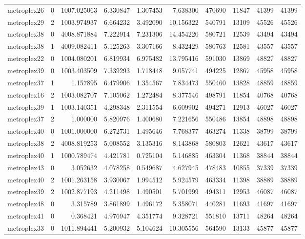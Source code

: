 \begin{longtable}{|l|r|r|r|r|r|r|r|r|r|}
metroplex26 & 0 & 1007.025063 & 6.330847 & 1.307453 & 7.638300 & 470690 & 11847 & 41399 & 41399 \\
metroplex29 & 2 & 1003.974937 & 6.664232 & 3.492090 & 10.156322 & 540791 & 13109 & 45526 & 45526 \\
metroplex38 & 0 & 4008.871884 & 7.222914 & 7.231306 & 14.454220 & 580721 & 12539 & 43494 & 43494 \\
metroplex38 & 1 & 4009.082411 & 5.125263 & 3.307166 & 8.432429 & 580763 & 12581 & 43557 & 43557 \\
metroplex22 & 0 & 1004.080201 & 6.819934 & 6.975482 & 13.795416 & 591030 & 13869 & 48827 & 48827 \\
metroplex39 & 0 & 1003.403509 & 7.339293 & 1.718448 & 9.057741 & 494225 & 12867 & 45958 & 45958 \\
metroplex37 & 1 & 1.157895 & 6.479906 & 1.354567 & 7.834473 & 550460 & 13828 & 48859 & 48859 \\
metroplex16 & 2 & 1003.082707 & 7.105062 & 1.272484 & 8.377546 & 498791 & 11854 & 40768 & 40768 \\
metroplex39 & 1 & 1003.140351 & 4.298348 & 2.311554 & 6.609902 & 494271 & 12913 & 46027 & 46027 \\
metroplex37 & 2 & 1.000000 & 5.820976 & 1.400680 & 7.221656 & 550486 & 13854 & 48898 & 48898 \\
metroplex40 & 0 & 1001.000000 & 6.272731 & 1.495646 & 7.768377 & 463274 & 11338 & 38799 & 38799 \\
metroplex38 & 2 & 4008.819253 & 5.008552 & 3.135316 & 8.143868 & 580803 & 12621 & 43617 & 43617 \\
metroplex40 & 1 & 1000.789474 & 4.421781 & 0.725104 & 5.146885 & 463304 & 11368 & 38844 & 38844 \\
metroplex43 & 0 & 3.052632 & 4.078258 & 0.549687 & 4.627945 & 478483 & 10855 & 37339 & 37339 \\
metroplex40 & 2 & 1001.263158 & 3.930067 & 1.994512 & 5.924579 & 463334 & 11398 & 38889 & 38889 \\
metroplex39 & 2 & 1002.877193 & 4.211498 & 1.490501 & 5.701999 & 494311 & 12953 & 46087 & 46087 \\
metroplex48 & 0 & 3.315789 & 3.861899 & 1.496172 & 5.358071 & 440281 & 11693 & 41697 & 41697 \\
metroplex41 & 0 & 0.368421 & 4.976947 & 4.351774 & 9.328721 & 551810 & 13711 & 48264 & 48264 \\
metroplex33 & 0 & 1011.894441 & 5.200932 & 5.104624 & 10.305556 & 564590 & 13133 & 45877 & 45877 \\

\end{longtable}
